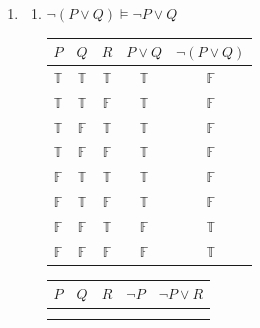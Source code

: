 \documentclass[a4paper,12pt]{article}
\begin{document}
\begin{enumerate}
\begin{enumerate}
\begin{table}[!htb]
\begin{minipage}{.2\linewidth}
\begin{tabular}{|c|c|c|}
\end{tabular}
    \end{minipage} 
\end{table}
\end{enumerate}
\item 
\begin{enumerate}
\item $\neg(P\lor Q)\models \neg P\lor Q$
\begin{table}[!htb]\centering
    \begin{minipage}{.4\linewidth}
      \centering
        \begin{tabular}{|c|c|c|c|c|}\hline
$P$          & $Q$          & $R$          & $P\lor Q$    & $\neg(P\lor Q)$                      \\\hline
$\mathbb{T}$ & $\mathbb{T}$ & $\mathbb{T}$ & $\mathbb{T}$ & \cellcolor[HTML]{FFCCC9}$\mathbb{F}$ \\
$\mathbb{T}$ & $\mathbb{T}$ & $\mathbb{F}$ & $\mathbb{T}$ & \cellcolor[HTML]{FFCCC9}$\mathbb{F}$ \\
$\mathbb{T}$ & $\mathbb{F}$ & $\mathbb{T}$ & $\mathbb{T}$ & \cellcolor[HTML]{FFCCC9}$\mathbb{F}$ \\
$\mathbb{T}$ & $\mathbb{F}$ & $\mathbb{F}$ & $\mathbb{T}$ & \cellcolor[HTML]{FFCCC9}$\mathbb{F}$ \\
$\mathbb{F}$ & $\mathbb{T}$ & $\mathbb{T}$ & $\mathbb{T}$ & \cellcolor[HTML]{FFCCC9}$\mathbb{F}$ \\
$\mathbb{F}$ & $\mathbb{T}$ & $\mathbb{F}$ & $\mathbb{T}$ & \cellcolor[HTML]{FFCCC9}$\mathbb{F}$ \\
$\mathbb{F}$ & $\mathbb{F}$ & $\mathbb{T}$ & $\mathbb{F}$ & $\mathbb{T}$                         \\
$\mathbb{F}$ & $\mathbb{F}$ & $\mathbb{F}$ & $\mathbb{F}$ & $\mathbb{T}$    \\\hline                    
\end{tabular}
    \end{minipage}%
    \begin{minipage}{.4\linewidth}
      \centering
        \begin{tabular}{|c|c|c|c|c|}\hline
$P$          & $Q$          & $R$          & $\neg P$     & $\neg P\lor R$ \\\hline
\rowcolor[HTML]{FFCCC9} 
             &              &              &              &                \\
\rowcolor[HTML]{FFCCC9} 
             &              &              &              &                \\

\end{tabular}
\end{minipage}
\end{table}
\end{enumerate}
\end{enumerate}
\end{document}

